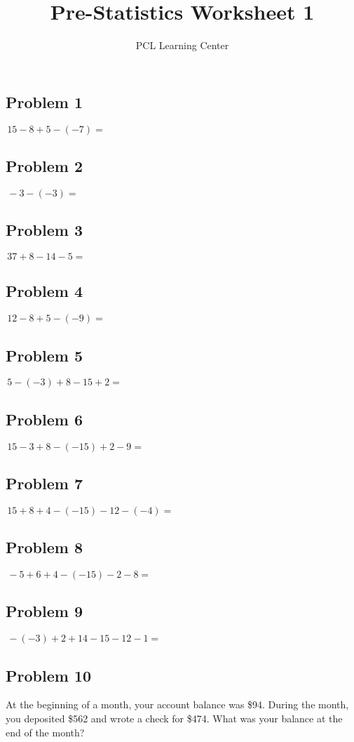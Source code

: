 \documentclass[12pt]{article}
\title{Pre-Statistics Worksheet 1}
\author{PCL Learning Center}
\date{}
\begin{document}
\maketitle

\subsection*{Problem 1}
\(\,15 - 8 + 5 - (-7) =\)

\subsection*{Problem 2}
\(\,-3 - (-3) =\)

\subsection*{Problem 3}
\(\,37 + 8 - 14 - 5 =\)

\subsection*{Problem 4}
\(\,12 - 8 + 5 - (-9) =\)

\subsection*{Problem 5}
\(\,5 - (-3) + 8 - 15 + 2 =\)

\subsection*{Problem 6}
\(\,15 - 3 + 8 - (-15) + 2 - 9 =\)

\subsection*{Problem 7}
\(\,15 + 8 + 4 - (-15) - 12 - (-4) =\)

\subsection*{Problem 8}
\(\,-5 + 6 + 4 - (-15) - 2 - 8 =\)

\subsection*{Problem 9}
\(\,-(-3) + 2 + 14 - 15 - 12 - 1 =\)

\subsection*{Problem 10}
At the beginning of a month, your account balance was \$94. During the month, you deposited \$562 and wrote a check for \$474. What was your balance at the end of the month?
\end{document}
